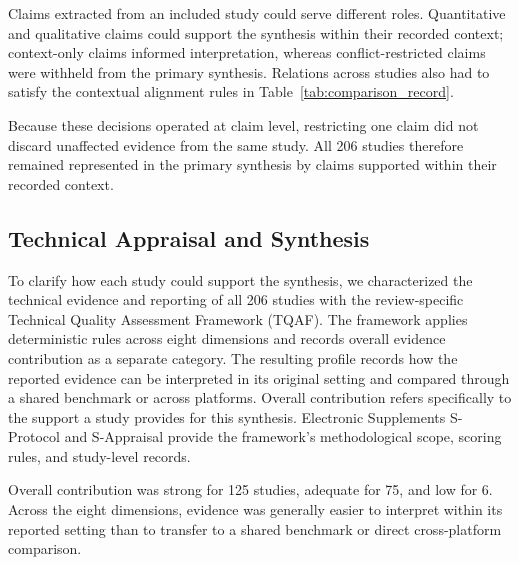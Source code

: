 Claims extracted from an included study could serve different roles.
Quantitative and qualitative claims could support the synthesis within their
recorded context; context-only claims informed interpretation, whereas
conflict-restricted claims were withheld from the primary synthesis. Relations
across studies also had to satisfy the contextual alignment rules in
Table~\ref{tab:comparison_record}.

Because these decisions operated at claim level, restricting one claim did not
discard unaffected evidence from the same study. All 206 studies therefore
remained represented in the primary synthesis by claims supported within their
recorded context.

\subsection{Technical Appraisal and Synthesis}

To clarify how each study could support the synthesis, we characterized the
technical evidence and reporting of all 206 studies with the review-specific
Technical Quality Assessment Framework (TQAF). The framework applies
deterministic rules across eight dimensions and records overall evidence
contribution as a separate category. The resulting profile records how the
reported evidence can be interpreted in its original setting and compared
through a shared benchmark or across platforms. Overall contribution refers
specifically to the support a study provides for this synthesis. Electronic
Supplements S-Protocol and S-Appraisal provide the framework's methodological
scope, scoring rules, and study-level records.

Overall contribution was strong for 125 studies, adequate for 75, and low for
6. Across the eight dimensions, evidence was generally easier to interpret
within its reported setting than to transfer to a shared benchmark or direct
cross-platform comparison.

